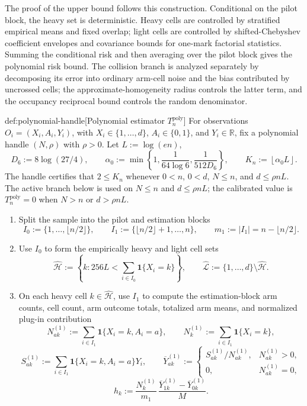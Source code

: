\documentclass[11pt]{article}
\begin{document}
The proof of the upper bound follows this construction. Conditional on the pilot block, the heavy set is deterministic. Heavy cells are controlled by stratified empirical means and fixed overlap; light cells are controlled by shifted-Chebyshev coefficient envelopes and covariance bounds for one-mark factorial statistics. Summing the conditional risk and then averaging over the pilot block gives the polynomial risk bound. The collision branch is analyzed separately by decomposing its error into ordinary arm-cell noise and the bias contributed by uncrossed cells; the approximate-homogeneity radius controls the latter term, and the occupancy reciprocal bound controls the random denominator.

\begin{algorithmv}{def:polynomial-handle}[Polynomial estimator \(T_n^{\mathrm{poly}}\)]
For observations \(O_i=(X_i,A_i,Y_i)\), with \(X_i\in\{1,\ldots,d\}\), \(A_i\in\{0,1\}\), and \(Y_i\in\mathbb R\), fix a polynomial handle \((N,\rho)\) with \(\rho>0\).  Let \(L:=\log(en)\),
\[
D_6:=8\log(27/4),
\qquad
\alpha_0:=\min\left\{1,\frac{1}{64\log 6},\frac{1}{512D_6}\right\},
\qquad
K_n:=\left\lfloor \alpha_0 L\right\rfloor .
\]
The handle certifies that \(2\le K_n\) whenever \(0<n\), \(0<d\), \(N\le n\), and \(d\le \rho nL\).  The active branch below is used on \(N\le n\) and \(d\le \rho nL\); the calibrated value is \(T_n^{\mathrm{poly}}=0\) when \(N>n\) or \(d>\rho nL\).

\begin{enumerate}
\item Split the sample into the pilot and estimation blocks
\[
I_0:=\{1,\ldots,\lfloor n/2\rfloor\},
\qquad
I_1:=\{\lfloor n/2\rfloor+1,\ldots,n\},
\qquad
m_1:=|I_1|=n-\lfloor n/2\rfloor .
\]

\item Use \(I_0\) to form the empirically heavy and light cell sets
\[
\widehat{\mathcal H}
:=
\left\{k:256L<\sum_{i\in I_0}\mathbf 1\{X_i=k\}\right\},
\qquad
\widehat{\mathcal L}
:=
\{1,\ldots,d\}\setminus \widehat{\mathcal H}.
\]

\item On each heavy cell \(k\in\widehat{\mathcal H}\), use \(I_1\) to compute the estimation-block arm counts, cell count, arm outcome totals, totalized arm means, and normalized plug-in contribution
\[
N_{ak}^{(1)}
:=
\sum_{i\in I_1}\mathbf 1\{X_i=k,A_i=a\},
\qquad
N_k^{(1)}
:=
\sum_{i\in I_1}\mathbf 1\{X_i=k\},
\]
\[
S_{ak}^{(1)}
:=
\sum_{i\in I_1}\mathbf 1\{X_i=k,A_i=a\}Y_i,
\qquad
\overline Y_{ak}^{(1)}
:=
\begin{cases}
S_{ak}^{(1)}/N_{ak}^{(1)}, & N_{ak}^{(1)}>0,\\
0, & N_{ak}^{(1)}=0,
\end{cases}
\]
\[
\widehat h_k
:=
\frac{N_k^{(1)}}{m_1}\,
\frac{\overline Y_{1k}^{(1)}-\overline Y_{0k}^{(1)}}{M}.
\]


\end{enumerate}
\end{algorithmv}
\end{document}
